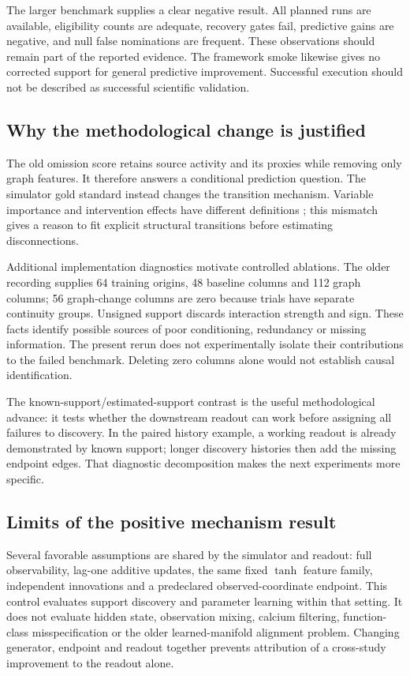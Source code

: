 \documentclass[11pt,a4paper]{article}
\begin{document}
The larger benchmark supplies a clear negative result. All planned runs are
available, eligibility counts are adequate, recovery gates fail, predictive gains
are negative, and null false nominations are frequent. These observations should
remain part of the reported evidence. The framework smoke likewise gives no
corrected support for general predictive improvement. Successful execution should
not be described as successful scientific validation.

\subsection{Why the methodological change is justified}

The old omission score retains source activity and its proxies while removing
only graph features. It therefore answers a conditional prediction question. The
simulator gold standard instead changes the transition mechanism. Variable
importance and intervention effects have different definitions
\citep{williamson2023importance,pearl2010causalinference}; this mismatch gives a
reason to fit explicit structural transitions before estimating disconnections.

Additional implementation diagnostics motivate controlled ablations. The older
recording supplies 64 training origins, 48 baseline columns and 112 graph columns;
56 graph-change columns are zero because trials have separate continuity groups.
Unsigned support discards interaction strength and sign. These facts identify
possible sources of poor conditioning, redundancy or missing information. The
present rerun does not experimentally isolate their contributions to the failed
benchmark. Deleting zero columns alone would not establish causal identification.

The known-support/estimated-support contrast is the useful methodological advance:
it tests whether the downstream readout can work before assigning all failures to
discovery. In the paired history example, a working readout is already demonstrated
by known support; longer discovery histories then add the missing endpoint edges.
That diagnostic decomposition makes the next experiments more specific.

\subsection{Limits of the positive mechanism result}

Several favorable assumptions are shared by the simulator and readout: full
observability, lag-one additive updates, the same fixed $\tanh$ feature family,
independent innovations and a predeclared observed-coordinate endpoint. This
control evaluates support discovery and parameter learning within that setting.
It does not evaluate hidden state, observation mixing, calcium filtering,
function-class misspecification or the older learned-manifold alignment problem.
Changing generator, endpoint and readout together prevents attribution of a
cross-study improvement to the readout alone.
\end{document}
